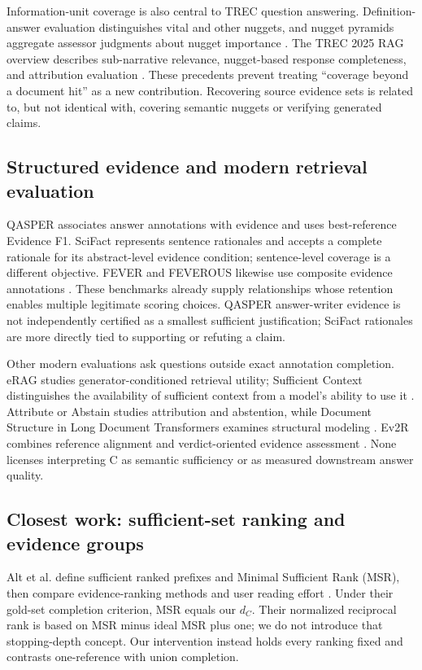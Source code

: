 \documentclass[twoside,a4paper,11pt]{article}
\begin{document}
Information-unit coverage is also central to TREC question answering. Definition-answer evaluation distinguishes vital and other nuggets, and nugget pyramids aggregate assessor judgments about nugget importance \citep{voorhees2003,lin2006}. The TREC 2025 RAG overview describes sub-narrative relevance, nugget-based response completeness, and attribution evaluation \citep{trecrag2025}. These precedents prevent treating ``coverage beyond a document hit'' as a new contribution. Recovering source evidence sets is related to, but not identical with, covering semantic nuggets or verifying generated claims.


\subsection{Structured evidence and modern retrieval evaluation}
QASPER associates answer annotations with evidence and uses best-reference Evidence F1. SciFact represents sentence rationales and accepts a complete rationale for its abstract-level evidence condition; sentence-level coverage is a different objective. FEVER and FEVEROUS likewise use composite evidence annotations \citep{qasper,scifact,fever,feverous}. These benchmarks already supply relationships whose retention enables multiple legitimate scoring choices. QASPER answer-writer evidence is not independently certified as a smallest sufficient justification; SciFact rationales are more directly tied to supporting or refuting a claim.

Other modern evaluations ask questions outside exact annotation completion. eRAG studies generator-conditioned retrieval utility; Sufficient Context distinguishes the availability of sufficient context from a model's ability to use it \citep{erag,sufficient}. Attribute or Abstain studies attribution and abstention, while Document Structure in Long Document Transformers examines structural modeling \citep{lab,structure}. Ev2R combines reference alignment and verdict-oriented evidence assessment \citep{ev2r}. None licenses interpreting C as semantic sufficiency or as measured downstream answer quality.


\subsection{Closest work: sufficient-set ranking and evidence groups}
Alt et al. define sufficient ranked prefixes and Minimal Sufficient Rank (MSR), then compare evidence-ranking methods and user reading effort \citep{alt2026}. Under their gold-set completion criterion, MSR equals our $d_{C}$. Their normalized reciprocal rank is based on MSR minus ideal MSR plus one; we do not introduce that stopping-depth concept. Our intervention instead holds every ranking fixed and contrasts one-reference with union completion.
\end{document}
